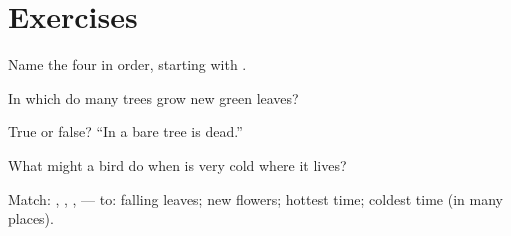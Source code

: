 \section{Exercises}

\begin{exercise}[$\star$]\label{exo:g1:seasons:1}
Name the four  in order, starting with .
\end{exercise}

\begin{exercise}[$\star$]\label{exo:g1:seasons:2}
In which  do many trees grow new green leaves?
\end{exercise}

\begin{exercise}[$\star$]\label{exo:g1:seasons:3}
True or false? ``In  a bare tree is dead.''
\end{exercise}

\begin{exercise}[$\star$]\label{exo:g1:seasons:4}
What might a bird do when  is very cold where it lives?
\end{exercise}

\begin{exercise}[$\star\star$]\label{exo:g1:seasons:5}
Match: , , ,  --- to: falling leaves; new
flowers; hottest time; coldest time (in many places).
\end{exercise}

